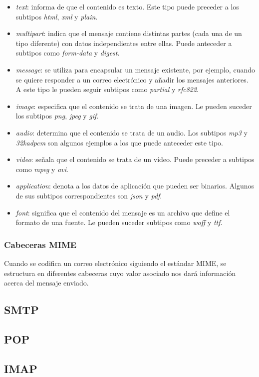 \begin{itemize}
	\item \textit{text}: informa de que el contenido es texto. Este tipo puede preceder a los subtipos \textit{html}, \textit{xml} y \textit{plain}.
	\item\textit{multipart}: indica que el mensaje contiene distintas partes (cada una de un tipo diferente) con datos independientes entre ellas. Puede anteceder a subtipos como \textit{form-data} y \textit{digest}.
	\item\textit{message}: se utiliza para encapsular un mensaje existente, por ejemplo, cuando se quiere responder a un correo electrónico y añadir los mensajes anteriores. A este tipo le pueden seguir subtipos como \textit{partial} y \textit{rfc822}.
	\item\textit{image}: especifica que el contenido se trata de una imagen. Le pueden suceder los subtipos \textit{png}, \textit{jpeg} y \textit{gif}.
	\item\textit{audio}: determina que el contenido se trata de un audio. Los subtipos \textit{mp3} y \textit{32kadpcm} son algunos ejemplos a los que puede anteceder este tipo.
	\item\textit{video}: señala que el contenido se trata de un vídeo. Puede preceder a subtipos como \textit{mpeg} y \textit{avi}.
	\item\textit{application}: denota a los datos de aplicación que pueden ser binarios. Algunos de sus subtipos correspondientes son \textit{json} y \textit{pdf}.
	\item\textit{font}: significa que el contenido del mensaje es un archivo que define el formato de una fuente. Le pueden suceder subtipos como \textit{woff} y \textit{ttf}.
\end{itemize}

\subsubsection{Cabeceras MIME}
Cuando se codifica un correo electrónico siguiendo el estándar MIME, se estructura en diferentes cabeceras cuyo valor asociado nos dará información acerca del mensaje enviado.

\subsection{SMTP}\label{ss:smtp}
\subsection{POP}\label{ss:pop}
\subsection{IMAP}\label{ss:imap}